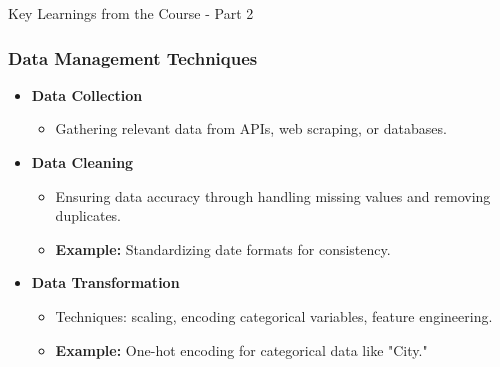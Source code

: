 \documentclass[aspectratio=169]{beamer}
\begin{document}
\begin{frame}[fragile]{Key Learnings from the Course - Part 2}
    \frametitle{Data Management Techniques}
    \begin{itemize}
        \item \textbf{Data Collection}
        \begin{itemize}
            \item Gathering relevant data from APIs, web scraping, or databases.
        \end{itemize}
        
        \item \textbf{Data Cleaning}
        \begin{itemize}
            \item Ensuring data accuracy through handling missing values and removing duplicates.
            \item \textbf{Example:} Standardizing date formats for consistency.
        \end{itemize}
        
        \item \textbf{Data Transformation}
        \begin{itemize}
            \item Techniques: scaling, encoding categorical variables, feature engineering.
            \item \textbf{Example:} One-hot encoding for categorical data like "City."
        \end{itemize}
    \end{itemize}
\end{frame}
\end{document}
